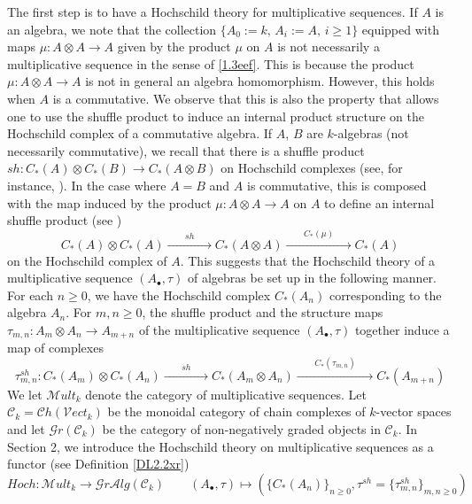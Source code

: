 \documentclass[10pt, colorlinks]{article}
\numberwithin{equation}{section} \DeclareMathSizes{2}{10}{12}{13}
\begin{document}
\smallskip
The first step is to have a Hochschild theory for multiplicative sequences. If $A$ is an algebra, we note that the collection  $\{\mbox{$A_0:=k$, $A_i:=A$, $i\geq 1$}\}$ equipped with maps $\mu:A\otimes A\longrightarrow A$ given by the product $\mu$ on $A$ is not necessarily a multiplicative sequence in the sense of \eqref{1.3eef}. This is because the product $\mu:A\otimes A
\longrightarrow A$ is not in general an algebra homomorphism. However, this holds when $A$ is a commutative. We observe that this is also the property that allows one to use the shuffle product to induce an internal product structure on the Hochschild complex of a commutative algebra. If $A$, $B$ are $k$-algebras (not necessarily commutative), we recall that there is a shuffle product $sh:C_*(A)\otimes C_*(B)\longrightarrow C_*(A\otimes B)$ on Hochschild complexes (see, for instance, \cite[$\S$ 4.2.3]{LD}). In the case where $A=B$ and $A$ is commutative, this is composed with the map induced by the product $\mu:A\otimes A\longrightarrow A$ on $A$ to define an internal shuffle product (see \cite[$\S$ 4.2.6]{LD})
\begin{equation}
C_*(A)\otimes C_*(A) \xrightarrow{\qquad sh \qquad}C_*(A\otimes A)\xrightarrow{\qquad C_*(\mu)\qquad}C_*(A)
\end{equation} on the Hochschild complex of $A$. This suggests that the Hochschild theory of a multiplicative sequence $(A_\bullet,\tau)$ of algebras be set up in the following manner. For each $n\geq 0$, we have the Hochschild complex $C_*(A_n)$ corresponding to the algebra $A_n$. For $m,n\geq 0$, the shuffle product and the structure maps $\tau_{m,n}: A_m \otimes A_n \longrightarrow A_{m+n}$ of the multiplicative sequence $(A_\bullet,\tau)$ together induce a map of complexes
\begin{equation}\label{1.5}
\tau^{sh}_{m,n}:C_*(A_m)\otimes C_*(A_n) \xrightarrow{\qquad sh \qquad}C_*(A_m\otimes A_n)\xrightarrow{\qquad C_*(\tau_{m,n})\qquad}C_*(A_{m+n})
\end{equation} We let $\mathscr{M}ult_k$ denote the category of multiplicative sequences. Let $\mathcal C_k=\mathcal Ch(\mathcal Vect_k)$ be the monoidal category of chain complexes of $k$-vector spaces and let $\mathscr Gr(\mathcal C_k) $ be the category of non-negatively graded  objects in $\mathcal C_k$. In Section 2, we introduce the Hochschild theory on multiplicative sequences as a functor (see Definition \ref{DL2.2xr}) 
\begin{equation} Hoch:\mathscr{M}ult_k\longrightarrow \mathscr Gr\mathcal Alg(\mathcal C_k) \qquad ({A}_\bullet,\tau)\mapsto (\{C_*(A_n)\}_{n\geq0},\tau^{sh}=\{\tau^{sh}_{m,n}\}_{m,n\geq 0})
\end{equation}
\end{document}
